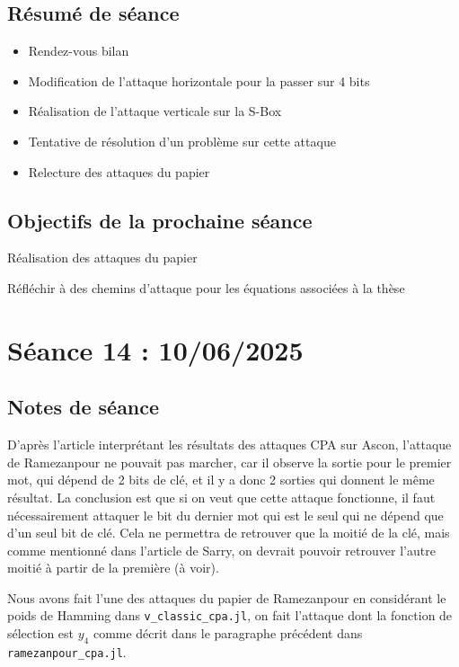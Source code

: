 \documentclass[12pt]{article}
\newcommand{\cmark}{\ding{51}}%
\newcommand{\done}{\rlap{$\square$}{\raisebox{2pt}{\large\hspace{1pt}\cmark}}%
	\hspace{-2.5pt}}
\begin{document}
	\subsection{Résumé de séance}
	\begin{itemize}
		\item Rendez-vous bilan
		\item Modification de l'attaque horizontale pour la passer sur 4 bits
		\item Réalisation de l'attaque verticale sur la S-Box
		\item Tentative de résolution d'un problème sur cette attaque
		\item Relecture des attaques du papier
	\end{itemize}
	
	\subsection{Objectifs de la prochaine séance}
	\begin{todolist}
		\item[\done] Réalisation des attaques du papier
		\item[\done] Réfléchir à des chemins d'attaque pour les équations associées à la thèse
	\end{todolist}
	
	
	\section{Séance 14 : 10/06/2025}
	\subsection{Notes de séance}
	D'après l'article interprétant les résultats des attaques CPA sur Ascon, l'attaque de Ramezanpour ne pouvait pas marcher, car il observe la sortie pour le premier mot, qui dépend de 2 bits de clé, et il y a donc 2 sorties qui donnent le même résultat. La conclusion est que si on veut que cette attaque fonctionne, il faut nécessairement attaquer le bit du dernier mot qui est le seul qui ne dépend que d'un seul bit de clé. Cela ne permettra de retrouver que la moitié de la clé, mais comme mentionné dans l'article de Sarry, on devrait pouvoir retrouver l'autre moitié à partir de la première (à voir).
	
	Nous avons fait l'une des attaques du papier de Ramezanpour en considérant le poids de Hamming dans \verb|v_classic_cpa.jl|, on fait l'attaque dont la fonction de sélection est $y_4$ comme décrit dans le paragraphe précédent dans \verb|ramezanpour_cpa.jl|.
	
\end{document}
